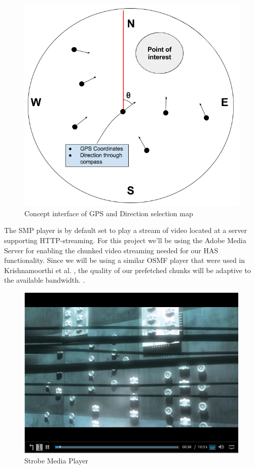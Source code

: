 \documentclass[9pt,a4paper]{acmproc}
\begin{document}
\begin{figure}[t!]
\begin{center}
	\includegraphics[scale=0.5]{teomet.png}
	\caption{Concept interface of GPS and Direction selection map}
	\label{fig:gpsinterface}
\end{center}
\end{figure}


The SMP player is by default set to play a stream of video located at a server supporting HTTP-streaming. For this project we'll be using the Adobe Media Server for enabling the chunked video streaming needed for our HAS functionality. Since we will be using a similar OSMF player that were used in Krishnamoorthi et al. , the quality of our prefetched chunks will be adaptive to the available bandwidth. \cite{hasmultipath}.

\begin{figure}[t!]
\begin{center}
	\includegraphics[scale=0.5]{Media_player.png}
	\caption{Strobe Media Player}
	\label{fig:mediaplayer}
\end{center}
\end{figure}
\end{document}
